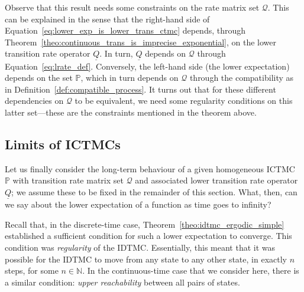 \documentclass[graybox]{svmult}
\newcommand{\nats}{\mathbb{N}}
\newcommand{\lrate}{\underline{Q}}
\begin{document}
Observe that this result needs some constraints on the rate matrix set $\mathcal{Q}$. This can be explained in the sense that the right-hand side of Equation~\eqref{eq:lower_exp_is_lower_trans_ctmc} depends, through Theorem~\ref{theo:continuous_trans_is_imprecise_exponential}, on the lower transition rate operator $\underline{Q}$. In turn, $\underline{Q}$ depends on $\mathcal{Q}$ through Equation~\eqref{eq:lrate_def}. Conversely, the left-hand side (the lower expectation) depends on the set $\mathbb{P}$, which in turn depends on $\mathcal{Q}$ through the compatibility as in Definition~\ref{def:compatible_process}. It turns out that for these different dependencies on $\mathcal{Q}$ to be equivalent, we need some regularity conditions on this latter set---these are the constraints mentioned in the theorem above. 

\subsection{Limits of ICTMCs}

Let us finally consider the long-term behaviour of a given homogeneous ICTMC $\mathbb{P}$ with transition rate matrix set $\mathcal{Q}$ and associated lower transition rate operator $\lrate$; we assume these to be fixed in the remainder of this section. What, then, can we say about the lower expectation of a function as time goes to infinity?

Recall that, in the discrete-time case, Theorem~\ref{theo:idtmc_ergodic_simple} established a sufficient condition for such a lower expectation to converge. This condition was \emph{regularity} of the IDTMC. Essentially, this meant that it was possible for the IDTMC to move from any state to any other state, in exactly $n$ steps, for some $n\in\nats$. In the continuous-time case that we consider here, there is a similar condition: \emph{upper reachability} between all pairs of states.
\end{document}
